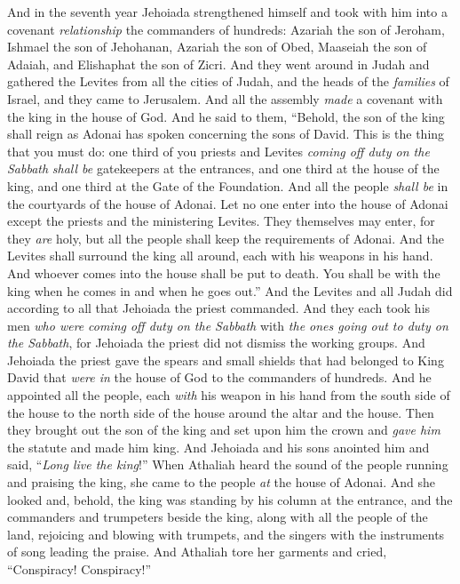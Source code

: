 \begin{biblechapter} %
 And in the seventh year Jehoiada strengthened himself and took with him into a covenant \textit{relationship} the commanders of hundreds: Azariah the son of Jeroham, Ishmael the son of Jehohanan, Azariah the son of Obed, Maaseiah the son of Adaiah, and Elishaphat the son of Zicri.
\verse And they went around in Judah and gathered the Levites from all the cities of Judah, and the heads of the \textit{families} of Israel, and they came to Jerusalem.
\verse And all the assembly \textit{made} a covenant with the king in the house of God. And he said to them, “Behold, the son of the king shall reign as Adonai has spoken concerning the sons of David.
\verse This is the thing that you must do: one third of you priests and Levites \textit{coming off duty on the Sabbath} \textit{shall be} gatekeepers at the entrances,
\verse and one third at the house of the king, and one third at the Gate of the Foundation. And all the people \textit{shall be} in the courtyards of the house of Adonai.
\verse Let no one enter into the house of Adonai except the priests and the ministering Levites. They themselves may enter, for they \textit{are} holy, but all the people shall keep the requirements of Adonai.
\verse And the Levites shall surround the king all around, each with his weapons in his hand. And whoever comes into the house shall be put to death. You shall be with the king when he comes in and when he goes out.”
\verse And the Levites and all Judah did according to all that Jehoiada the priest commanded. And they each took his men \textit{who were} \textit{coming off duty on the Sabbath} with \textit{the ones going out to duty on the Sabbath}, for Jehoiada the priest did not dismiss the working groups.
\verse And Jehoiada the priest gave the spears and small shields that had belonged to King David that \textit{were in} the house of God to the commanders of hundreds.
\verse And he appointed all the people, each \textit{with} his weapon in his hand from the south side of the house to the north side of the house around the altar and the house.
\verse Then they brought out the son of the king and set upon him the crown and \textit{gave him} the statute and made him king. And Jehoiada and his sons anointed him and said, “\textit{Long live the king}!”
\verse When Athaliah heard the sound of the people running and praising the king, she came to the people \textit{at} the house of Adonai.
\verse And she looked and, behold, the king was standing by his column at the entrance, and the commanders and trumpeters beside the king, along with all the people of the land, rejoicing and blowing with trumpets, and the singers with the instruments of song leading the praise. And Athaliah tore her garments and cried, “Conspiracy! Conspiracy!”

\end{biblechapter}
